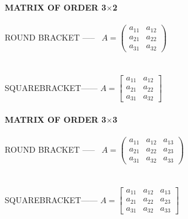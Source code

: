 \documentclass[14pt]{extarticle}
\begin{document}
\begin{fleqn}
\textbf{MATRIX OF ORDER 3$\times$2} \\ \\
ROUND BRACKET ----- \
\( A = \left( 
\begin{array}{cc} 
a_{11} & a_{12}\\ 
a_{21} & a_{22} \\
a_{31} & a_{32}
\end{array} 
\right) \) \\ \\ \\
SQUAREBRACKET------
\( A = \left[ 
\begin{array}{cc} 
a_{11} & a_{12}\\ 
a_{21} & a_{22} \\
a_{31} & a_{32}
\end{array} 
\right] \) \\ \\
\textbf{MATRIX OF ORDER 3$\times$3} \\ \\
ROUND BRACKET ----- \
\( A = \left( 
\begin{array}{ccc} 
a_{11} & a_{12} & a_{13}\\ 
a_{21} & a_{22} & a_{23}\\
a_{31} & a_{32} & a_{33}
\end{array} 
\right) \) \\ \\ \\
SQUAREBRACKET------
\( A = \left[ 
\begin{array}{ccc} 
a_{11} & a_{12} & a_{13}\\ 
a_{21} & a_{22} & a_{23}\\
a_{31} & a_{32} & a_{33}
\end{array} 
\right] \) 


\end{fleqn}
\end{document}
